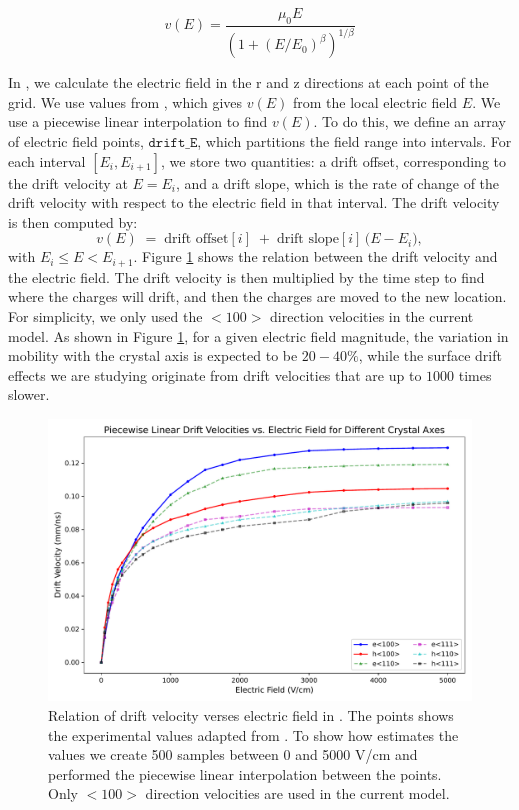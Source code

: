 \begin{equation}
v(E) = \frac{\mu_0 E}{(1 + (E/E_0)^\beta)^{1/\beta}}
\end{equation}

In {\ehd}, we calculate the electric field in the r and z directions at each point of the grid. We use values from \cite{OMAR19871351}, which gives $v(E)$ from the local electric field $E$. We use a piecewise linear interpolation to find $v(E)$. To do this, we define an array of electric field points, $\texttt{drift\_E}$, which partitions the field range into intervals. For each interval $[E_i, E_{i+1}]$, we store two quantities: a drift offset, corresponding to the drift velocity at $E = E_i$, and a drift slope, which is the rate of change of the drift velocity with respect to the electric field in that interval. The drift velocity is then
computed by:
\[
v(E) \;=\; \text{drift offset}[i]
\;+\; \text{drift slope}[i] \,\bigl( E - E_i \bigr),
\]
\noindent
with $E_i \le E < E_{i+1}$.  Figure \ref{ch3_fig_dv_vs_e} shows the relation between the drift velocity and the electric field. The drift velocity is then multiplied by the time step to find where the charges will drift, and then the charges are moved to the new location. For simplicity, we only used the $<100>$ direction velocities in the current model. As shown in Figure \ref{ch3_fig_dv_vs_e}, for a given electric field magnitude, the variation in mobility with the crystal axis is expected to be $20-40\%$, while the surface drift effects we are studying originate from drift velocities that are up to $1000$ times slower.

\begin{figure}[!htb]
    \includegraphics[trim={0cm 0 0cm 0},clip,width=0.99\linewidth]{ch3/figs/ehd_dv_e.pdf}
    \caption{Relation of drift velocity verses electric field in {\ehd}. The points shows the experimental values adapted from \cite{OMAR19871351}. To show how {\ehd} estimates the values we create 500 samples between 0 and 5000 V/cm and performed the piecewise linear interpolation between the points. Only $<100>$ direction velocities are used in the current model.}
    \label{ch3_fig_dv_vs_e}
\end{figure}

